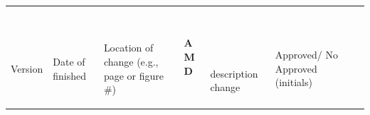\documentclass[twoside,letterpaper]{article}
\begin{document}
{\bigskip

\begin{flushleft}
\tablehead{}
\begin{supertabular}{|m{0.47685984in}|m{0.6087598in}|m{1.3587599in}|m{0.23375985in}|m{2.0462599in}|m{0.7337598in}|m{0.6330598in}|}
\hline
~

\centering {}\color{black} Version &
~

\centering {}\color{black} Date of finished &
~

\centering {}\color{black} Location of change
(e.g., page or figure \#) &
\centering {}\bfseries\color{black} A\newline
M\newline
D &
~

~

\centering {}\color{black} description
change &
~

\centering {}\color{black} Approved/ No Approved (initials)
&
~


\end{supertabular}
\end{flushleft}}
\end{document}
